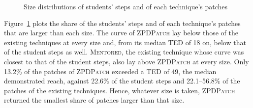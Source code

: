 \documentclass[conference]{IEEEtran}
\begin{document}
\begin{figure}[h]
%
\caption{Size distributions of students' steps and of each technique's patches}
\label{fig:patchsize}
\end{figure}

Figure~\ref{fig:patchsize} plots the share of the students' steps and of each technique's patches that are larger than each size. The curve of \textsc{ZPDPatch} lay below those of the existing techniques at every size and, from its median TED of 18 on, below that of the student steps as well. \textsc{Mentored}, the existing technique whose curve was closest to that of the student steps, also lay above \textsc{ZPDPatch} at every size. Only 13.2\% of the patches of \textsc{ZPDPatch} exceeded a TED of 49, the median demonstrated reach, against 22.6\% of the student steps and 22.1--56.8\% of the patches of the existing techniques. Hence, whatever size is taken, \textsc{ZPDPatch} returned the smallest share of patches larger than that size.
\end{document}
